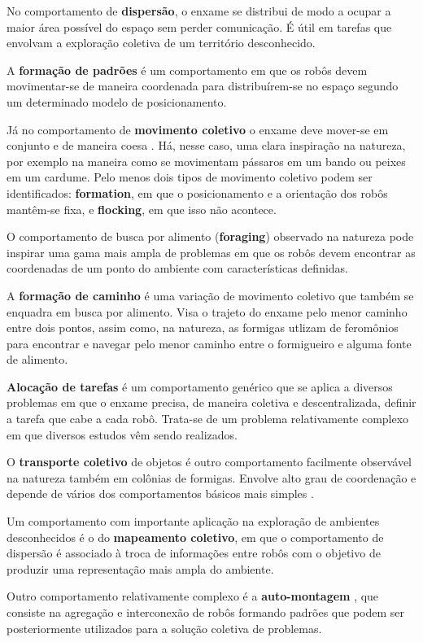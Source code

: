 No comportamento de \textbf{dispersão}, o enxame se distribui de modo a ocupar a maior área possível do espaço sem perder comunicação. É útil em tarefas que envolvam a exploração coletiva de um território desconhecido.

A \textbf{formação de padrões} é um comportamento em que os robôs devem movimentar-se de maneira coordenada para distribuírem-se no espaço segundo um determinado modelo de posicionamento.

Já no comportamento de \textbf{movimento coletivo} o enxame deve mover-se em conjunto e de maneira coesa \cite{sperati2008evolving}. Há, nesse caso, uma clara inspiração na natureza, por exemplo na maneira como se movimentam pássaros em um bando ou peixes em um cardume. Pelo menos dois tipos de movimento coletivo podem ser identificados: \textbf{formation}, em que o posicionamento e a orientação dos robôs mantêm-se fixa, e \textbf{flocking}, em que isso não acontece.

O comportamento de busca por alimento (\textbf{foraging}) observado na natureza pode inspirar uma gama mais ampla de problemas em que os robôs devem encontrar as coordenadas de um ponto do ambiente com características definidas.

A \textbf{formação de caminho} é uma variação de movimento coletivo que também se enquadra em busca por alimento. Visa o trajeto do enxame pelo menor caminho entre dois pontos, assim como, na natureza, as formigas utlizam de feromônios para encontrar e navegar pelo menor caminho entre o formigueiro e alguma fonte de alimento.

\textbf{Alocação de tarefas} é um comportamento genérico que se aplica a diversos problemas em que o enxame precisa, de maneira coletiva e descentralizada, definir a tarefa que cabe a cada robô. Trata-se de um problema relativamente complexo em que diversos estudos vêm sendo realizados.

O \textbf{transporte coletivo} de objetos é outro comportamento facilmente observável na natureza também em colônias de formigas. Envolve alto grau de coordenação e depende de vários dos comportamentos básicos mais simples \cite{gross2006autonomous}.

Um comportamento com importante aplicação na exploração de ambientes desconhecidos é o do \textbf{mapeamento coletivo}, em que o comportamento de dispersão é associado à troca de informações entre robôs com o objetivo de produzir uma representação mais ampla do ambiente.

Outro comportamento relativamente complexo é a \textbf{auto-montagem} \cite{christensen2007mechanism}, que consiste na agregação e interconexão de robôs formando padrões que podem ser posteriormente utilizados para a solução coletiva de problemas.

